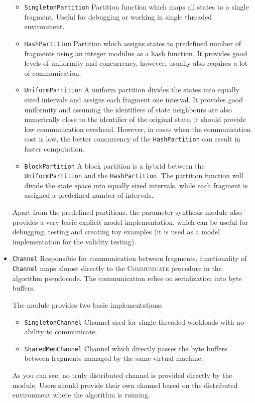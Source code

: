 \begin{itemize}
	\begin{itemize}
		\item \texttt{SingletonPartition} Partition function which maps all states to a single fragment. Useful for debugging or working in single threaded environment.
		\item \texttt{HashPartition} Partition which assigns states to predefined number of fragments using an integer modulus as a hash function. It provides good levels of uniformity and concurrency, however, usually also requires a lot of communication.
		\item \texttt{UniformPartition} A uniform partition divides the states into equally sized intervals and assigns each fragment one interval. It provides good uniformity and assuming the identifiers of state neighbours are also numerically close to the identifier of the original state, it should provide low communication overhead. However, in cases when the communication cost is low, the better concurrency of the \texttt{HashPartition} can result in faster computation.
		\item \texttt{BlockPartition} A block partition is a hybrid between the \texttt{UniformPartition} and the \texttt{HashPartition}. The partition function will divide the state space into equally sized intervals, while each fragment is assigned a predefined number of intervals.
	\end{itemize}

	Apart from the predefined partitions, the parameter synthesis module also provides a very basic explicit model implementation, which can be useful for debugging, testing and creating toy examples (it is used as a model implementation for the validity testing).

	\item \texttt{Channel} Responsible for communication between fragments, functionality of \texttt{Channel} maps almost directly to the \textsc{Communicate} procedure in the algorithm pseudocode. The communication relies on serialization into byte buffers.
	
	The module provides two basic implementations:
	
	\begin{itemize}
		\item \texttt{SingletonChannel} Channel used for single threaded workloads with no ability to communicate.
		\item \texttt{SharedMemChannel} Channel which directly passes the byte buffers between fragments managed by the same virtual machine.
	\end{itemize}

	As you can see, no truly distributed channel is provided directly by the module. Users should provide their own channel based on the distributed environment where the algorithm is running.

\end{itemize}

